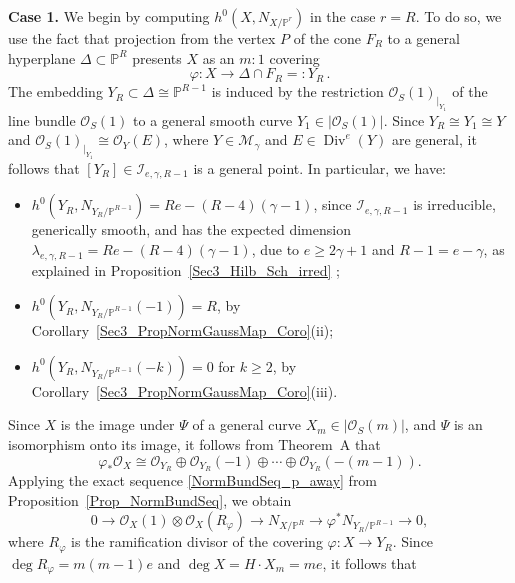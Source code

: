 \documentclass[a4paper,12pt]{amsart}
\def\Div{\operatorname{Div}}%
\begin{document}
{\bf Case 1.}
We begin by computing $h^0 (X, N_{X/\mathbb{P}^r})$ in the case $r = R$. To do so, we use the fact that projection from the vertex $P$ of the cone $F_R$ to a general hyperplane $\Delta \subset \mathbb{P}^R$ presents $X$ as an $m:1$ covering
\[
 \varphi : X \to \Delta \cap F_R =: Y_R \, .
\]
The embedding $Y_R \subset \Delta \cong \mathbb{P}^{R-1}$ is induced by the restriction ${\mathcal{O}_S (1)}_{|_{Y_1}}$ of the line bundle $\mathcal{O}_S (1)$ to a general smooth curve $Y_1 \in |\mathcal{O}_S (1)|$. Since $Y_R \cong Y_1 \cong Y$ and ${\mathcal{O}_S (1)}_{|_{Y_1}} \cong \mathcal{O}_Y (E)$, where $Y \in \mathcal{M}_{\gamma}$ and $E \in \Div^{e} (Y)$ are general, it follows that $[Y_R] \in \mathcal{I}_{e, \gamma, R-1}$ is a general point. In particular, we have:
\begin{itemize}
 \item $h^0 (Y_R, N_{Y_R/ \mathbb{P}^{R-1}}) = Re - (R-4)(\gamma - 1)$, since $\mathcal{I}_{e, \gamma, R-1}$ is irreducible, generically smooth, and has the expected dimension $\lambda_{e, \gamma, R-1} = Re - (R-4)(\gamma - 1)$, due to $e \geq 2\gamma + 1$ and $R-1 = e - \gamma$, as explained in \textnormal{Proposition~\ref{Sec3_Hilb_Sch_irred}} ;

 \item $h^0 (Y_R, N_{Y_R/ \mathbb{P}^{R-1}} (-1)) = R$, by \textnormal{Corollary~\ref{Sec3_PropNormGaussMap_Coro}(ii)};

 \item $h^0 (Y_R, N_{Y_R/ \mathbb{P}^{R-1}} (-k)) = 0$ for $k \geq 2$, by \textnormal{Corollary~\ref{Sec3_PropNormGaussMap_Coro}(iii)}.
\end{itemize}
Since $X$ is the image under $\Psi$ of a general curve $X_m \in |\mathcal{O}_S (m)|$, and $\Psi$ is an isomorphism onto its image, it follows from \textnormal{Theorem~A} that
\begin{equation}\label{Sec4_varphi*}
 \varphi_{\ast} \mathcal{O}_X \cong \mathcal{O}_{Y_R} \oplus \mathcal{O}_{Y_R} (-1) \oplus \cdots \oplus \mathcal{O}_{Y_R} (-(m-1)).
\end{equation}
Applying the exact sequence \eqref{NormBundSeq_p_away} from \textnormal{Proposition~\ref{Prop_NormBundSeq}}, we obtain
\begin{equation}\label{NormBundSeq_p_away_Sec4}
 0 \to \mathcal{O}_X (1) \otimes \mathcal{O}_X (R_{\varphi}) \to N_{X / \mathbb{P}^R} \to \varphi^{\ast} N_{Y_R / \mathbb{P}^{R-1}} \to 0 ,
\end{equation}
where $R_{\varphi}$ is the ramification divisor of the covering $\varphi : X \to Y_R$. Since $\deg R_{\varphi} = m(m-1)e$ and $\deg X = H \cdot X_m = me$, it follows that
\end{document}
